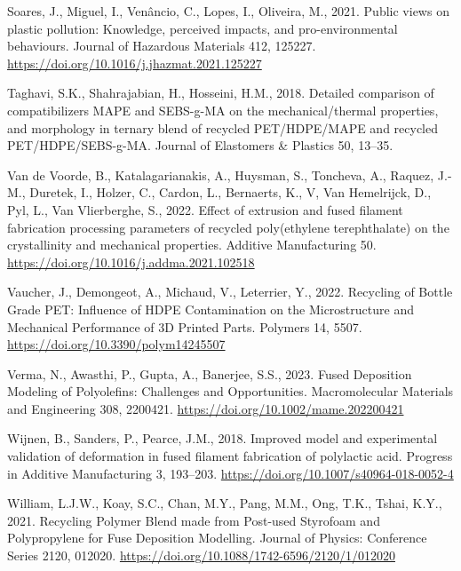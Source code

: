 \documentclass[
  12pt,
]{article}
\newlength{\cslhangindent}
\newlength{\cslentryspacingunit} %
\newenvironment{CSLReferences}[2] %
 {%
  \setlength{\parindent}{0pt}
  \ifodd #1
  \let\oldpar\par
  \def\par{\hangindent=\cslhangindent\oldpar}
  \fi
  \setlength{\parskip}{#2\cslentryspacingunit}
 }%
 {}
\begin{document}
\begin{CSLReferences}{1}{0}
\leavevmode{}%
Soares, J., Miguel, I., Venâncio, C., Lopes, I., Oliveira, M., 2021.
Public views on plastic pollution: {Knowledge}, perceived impacts, and
pro-environmental behaviours. Journal of Hazardous Materials 412,
125227. \url{https://doi.org/10.1016/j.jhazmat.2021.125227}

\leavevmode{}%
Taghavi, S.K., Shahrajabian, H., Hosseini, H.M., 2018. Detailed
comparison of compatibilizers MAPE and SEBS-g-MA on the
mechanical/thermal properties, and morphology in ternary blend of
recycled PET/HDPE/MAPE and recycled PET/HDPE/SEBS-g-MA. Journal of
Elastomers \& Plastics 50, 13--35.

\leavevmode{}%
Van de Voorde, B., Katalagarianakis, A., Huysman, S., Toncheva, A.,
Raquez, J.-M., Duretek, I., Holzer, C., Cardon, L., Bernaerts, K., V,
Van Hemelrijck, D., Pyl, L., Van Vlierberghe, S., 2022. Effect of
extrusion and fused filament fabrication processing parameters of
recycled poly(ethylene terephthalate) on the crystallinity and
mechanical properties. Additive Manufacturing 50.
\url{https://doi.org/10.1016/j.addma.2021.102518}

\leavevmode{}%
Vaucher, J., Demongeot, A., Michaud, V., Leterrier, Y., 2022. Recycling
of {Bottle Grade PET}: {Influence} of {HDPE Contamination} on the
{Microstructure} and {Mechanical Performance} of {3D Printed Parts}.
Polymers 14, 5507. \url{https://doi.org/10.3390/polym14245507}

\leavevmode{}%
Verma, N., Awasthi, P., Gupta, A., Banerjee, S.S., 2023. Fused
{Deposition Modeling} of {Polyolefins}: {Challenges} and
{Opportunities}. Macromolecular Materials and Engineering 308, 2200421.
\url{https://doi.org/10.1002/mame.202200421}

\leavevmode{}%
Wijnen, B., Sanders, P., Pearce, J.M., 2018. Improved model and
experimental validation of deformation in fused filament fabrication of
polylactic acid. Progress in Additive Manufacturing 3, 193--203.
\url{https://doi.org/10.1007/s40964-018-0052-4}

\leavevmode{}%
William, L.J.W., Koay, S.C., Chan, M.Y., Pang, M.M., Ong, T.K., Tshai,
K.Y., 2021. Recycling {Polymer Blend} made from {Post-used Styrofoam}
and {Polypropylene} for {Fuse Deposition Modelling}. Journal of Physics:
Conference Series 2120, 012020.
\url{https://doi.org/10.1088/1742-6596/2120/1/012020}


\end{CSLReferences}
\end{document}
